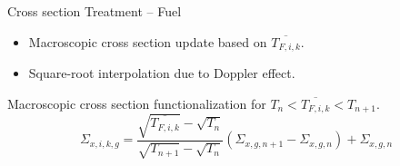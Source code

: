 \begin{frame}{Cross section Treatment -- Fuel}
  \begin{itemize}
    \item Macroscopic cross section update based on $\overline{T_{F,i,k}}$.
    \item Square-root interpolation due to Doppler effect.
  \end{itemize}

  Macroscopic cross section functionalization for ${T_n < \overline{T_{F,i,k}} <
  T_{n+1}}$.
  \begin{equation}
    \Sigma_{x,i,k,g} = 
      \frac{\sqrt{\overline{T_{F,i,k}}} - \sqrt{T_{n}}}
      {\sqrt{T_{n+1}}-\sqrt{T_{n}}}
      (\Sigma_{x,g,n+1} - \Sigma_{x,g,n})  + \Sigma_{x,g,n}
  \end{equation}
\end{frame}
